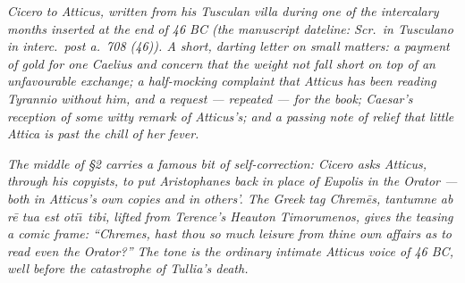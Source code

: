 
\textit{Cicero to Atticus, written from his Tusculan
villa during one of the intercalary months inserted at
the end of 46 BC (the manuscript dateline: \textit{Scr.\
in Tusculano in interc.\ post a.\ 708 (46)}). A short,
darting letter on small matters: a payment of gold for
one Caelius and concern that the weight not fall short
on top of an unfavourable exchange; a half-mocking
complaint that Atticus has been reading Tyrannio
without him, and a request --- repeated --- for the
book; Caesar's reception of some witty remark of
Atticus's; and a passing note of relief that little
Attica is past the chill of her fever.}

\textit{The middle of \S2 carries a famous bit of
self-correction: Cicero asks Atticus, through his
copyists, to put Aristophanes back in place of Eupolis
in the \textit{Orator} --- both in Atticus's own copies
and in others'. The Greek tag \textit{Chrem\=es,
tantumne ab r\=e tua est oti\=\i\ tibi}, lifted from
Terence's \textit{Heauton Timorumenos}, gives the
teasing a comic frame: ``Chremes, hast thou so much
leisure from thine own affairs as to read even the
\textit{Orator}?'' The tone is the ordinary intimate
Atticus voice of 46 BC, well before the catastrophe of
Tullia's death.}
